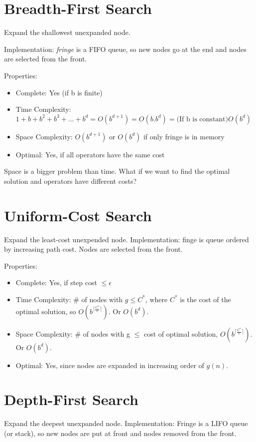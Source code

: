 \documentclass{article}
\begin{document}
\section{Breadth-First Search}
Expand the shallowest unexpanded node.

Implementation: \textit{fringe} is a FIFO queue, so new nodes go at the end and nodes are selected from the front.

Properties:
\begin{itemize}
	\item Complete: Yes (if b is finite)
	\item Time Complexity: $1+b+b^2+b^3+...+b^d = O(b^{d+1}) = O(b.b^d) = \text{(If b is constant)} O({b^d})$
	\item Space Complexity: $O(b^{d+1})$ or $O(b^d)$ if only fringe is in memory
	\item Optimal: Yes, if all operators have the same cost
\end{itemize}
Space is a bigger problem than time.
What if we want to find the optimal solution and operators have different costs?

\section{Uniform-Cost Search}
Expand the least-cost unexpended node.
Implementation: finge is queue ordered by increasing path cost.
Nodes are selected from the front.

Properties:
\begin{itemize}
	\item Complete: Yes, if step cost $\le \epsilon$
	\item Time Complexity: \# of nodes with $g \le C^*$, where $C^*$ is the cost of the optimal solution, so $O(b^{\lceil\frac{C^*}{\epsilon}\rceil})$. Or $O(b^d)$.
	\item Space Complexity: \# of nodes with g $\le$ cost of optimal solution, $O(b^{\lceil\frac{C^*}{\epsilon}\rceil})$. Or $O(b^d)$.
	\item Optimal: Yes, since nodes are expanded in increasing order of $g(n)$.
\end{itemize}

\section{Depth-First Search}
Expand the deepest unexpanded node.
Implementation: Fringe is a LIFO queue (or stack), so new nodes are put at front and nodes removed from the front.
\end{document}
